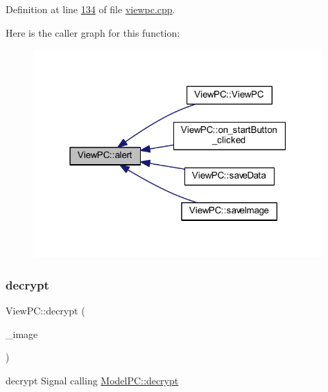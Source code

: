 Definition at line \mbox{\hyperlink{viewpc_8cpp_source_l00134}{134}} of file \mbox{\hyperlink{viewpc_8cpp_source}{viewpc.\+cpp}}.

Here is the caller graph for this function\+:
\nopagebreak
\begin{figure}[H]
\begin{center}
\leavevmode
\includegraphics[width=313pt]{class_view_p_c_a7c467169467789561078abc9d4fe57bd_icgraph}
\end{center}
\end{figure}
\mbox{\label{class_view_p_c_acf8feb98f757cc238dada1df2308e303}} 
\subsubsection{\texorpdfstring{decrypt}{decrypt}}
{\footnotesize\ttfamily View\+P\+C\+::decrypt (\begin{DoxyParamCaption}\item[{Q\+Image $\ast$}]{\+\_\+image }\end{DoxyParamCaption})\hspace{0.3cm}{\ttfamily [signal]}}



decrypt Signal calling \mbox{\hyperlink{class_model_p_c_af1f0b21565bf39808c4cdd448fad0ea8}{Model\+P\+C\+::decrypt}} 


